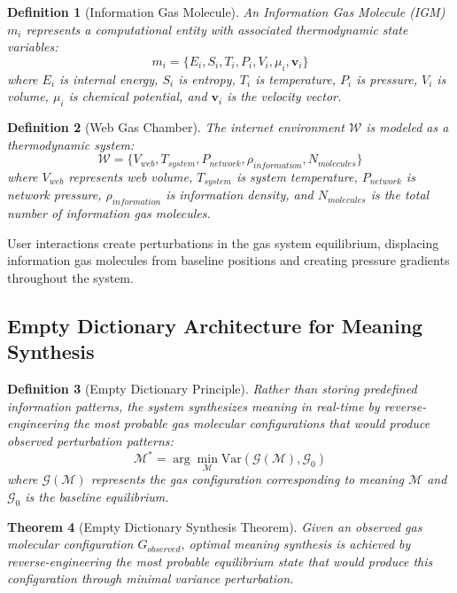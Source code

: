 \documentclass[12pt,a4paper]{article}
\newtheorem{theorem}{Theorem}
\newtheorem{definition}[theorem]{Definition}
\begin{document}
\begin{definition}[Information Gas Molecule]
An Information Gas Molecule (IGM) $m_i$ represents a computational entity with associated thermodynamic state variables:
\begin{equation}
m_i = \{E_i, S_i, T_i, P_i, V_i, \mu_i, \mathbf{v}_i\}
\end{equation}
where $E_i$ is internal energy, $S_i$ is entropy, $T_i$ is temperature, $P_i$ is pressure, $V_i$ is volume, $\mu_i$ is chemical potential, and $\mathbf{v}_i$ is the velocity vector.
\end{definition}

\begin{definition}[Web Gas Chamber]
The internet environment $\mathcal{W}$ is modeled as a thermodynamic system:
\begin{equation}
\mathcal{W} = \{V_{web}, T_{system}, P_{network}, \rho_{information}, N_{molecules}\}
\end{equation}
where $V_{web}$ represents web volume, $T_{system}$ is system temperature, $P_{network}$ is network pressure, $\rho_{information}$ is information density, and $N_{molecules}$ is the total number of information gas molecules.
\end{definition}

User interactions create perturbations in the gas system equilibrium, displacing information gas molecules from baseline positions and creating pressure gradients throughout the system.

\subsection{Empty Dictionary Architecture for Meaning Synthesis}

\begin{definition}[Empty Dictionary Principle]
Rather than storing predefined information patterns, the system synthesizes meaning in real-time by reverse-engineering the most probable gas molecular configurations that would produce observed perturbation patterns:
\begin{equation}
\mathcal{M}^* = \arg\min_{\mathcal{M}} \text{Var}(\mathcal{G}(\mathcal{M}), \mathcal{G}_0)
\end{equation}
where $\mathcal{G}(\mathcal{M})$ represents the gas configuration corresponding to meaning $\mathcal{M}$ and $\mathcal{G}_0$ is the baseline equilibrium.
\end{definition}

\begin{theorem}[Empty Dictionary Synthesis Theorem]
Given an observed gas molecular configuration $G_{observed}$, optimal meaning synthesis is achieved by reverse-engineering the most probable equilibrium state that would produce this configuration through minimal variance perturbation.
\end{theorem}
\end{document}
